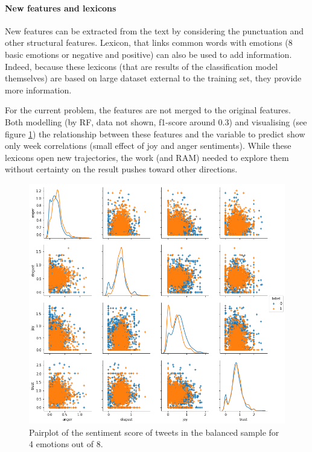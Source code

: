 \documentclass[a4paper]{tufte-handout}
\begin{document}
\begin{fullwidth}
\paragraph{New features and lexicons}

New features can be extracted from the text by considering the punctuation and other structural features. Lexicon, that links common words with emotions (8 basic emotions or negative and positive) can also be used to add information. Indeed, because these lexicons (that are results of the classification model themselves) are based on large dataset external to the training set, they provide more information.

For the current problem, the features are not merged to the original features. Both modelling (by RF, data not shown, f1-score around 0.3) and visualising (see figure \ref{sentiment}) the relationship between these features and the variable to predict show only week correlations (small effect of joy and anger sentiments). While these lexicons open new trajectories, the work (and RAM) needed to explore them without certainty on the result pushes toward other directions.

\begin{figure}\label{sentiment}
  \includegraphics[]{images/sentiment_scores.png}
  \caption{Pairplot of the sentiment score of tweets in the balanced sample for 4 emotions out of 8.}
\end{figure}


\end{fullwidth}
\end{document}
